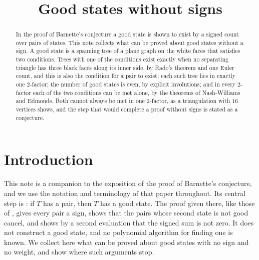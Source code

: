 \documentclass[10pt]{amsart}
\title{Good states without signs}
\author{}
\numberwithin{equation}{section}
\theoremstyle{definition}
\theoremstyle{remark}
\begin{document}
\begin{abstract}
In the proof of Barnette's conjecture a good state is shown to exist by a signed count over pairs of states.
This note collects what can be proved about good states without a sign.
A good state is a spanning tree of a plane graph on the white faces that satisfies two conditions.
Trees with one of the conditions exist exactly when no separating triangle has three black faces along its inner side, by Rado's theorem and one Euler count, and this is also the condition for a pair to exist; each such tree lies in exactly one $2$-factor; the number of good states is even, by explicit involutions; and in every $2$-factor each of the two conditions can be met alone, by the theorems of Nash-Williams and Edmonds.
Both cannot always be met in one $2$-factor, as a triangulation with $16$ vertices shows, and the step that would complete a proof without signs is stated as a conjecture.
\end{abstract}
\maketitle
\raggedbottom

\section{Introduction}\label{sec:intro}

This note is a companion to the exposition \cite{Paper} of the proof of Barnette's conjecture, and we use the notation and terminology of that paper throughout.
Its central step is \cite[Proposition~6.9]{Paper}: if $T$ has a pair, then $T$ has a good state.
The proof given there, like those of \cite{OpenAI,Li}, gives every pair a sign, shows that the pairs whose second state is not good cancel, and shows by a second evaluation that the signed sum is not zero.
It does not construct a good state, and no polynomial algorithm for finding one is known.
We collect here what can be proved about good states with no sign and no weight, and show where such arguments stop.
\end{document}
